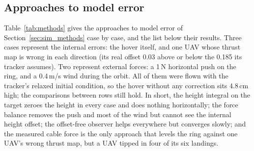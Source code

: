 
\subsection{Approaches to model error}
\label{sec:app_methods}

Table~\ref{tab:methods} gives the approaches to model error of Section~\ref{sec:sim_methods} case by
case, and the list below their results. Three cases represent the internal errors: the hover itself, and
one UAV whose thrust map is wrong in each direction (its real offset 0.03 above or below the 0.185 its
tracker assumes). Two represent external forces: a 1\,N horizontal push on the ring, and a 0.4\,m/s wind
during the orbit. All of them were flown with the tracker's relaxed initial condition, so the hover without
any correction sits 4.8\,cm high; the comparisons between rows still hold. In short, the height integral on
the target zeroes the height in every case and does nothing horizontally; the force balance removes the push
and most of the wind but cannot see the internal height offset; the offset-free observer helps everywhere but
converges slowly; and the measured cable force is the only approach that levels the ring against one UAV's
wrong thrust map, but a UAV tipped in four of its six landings.

